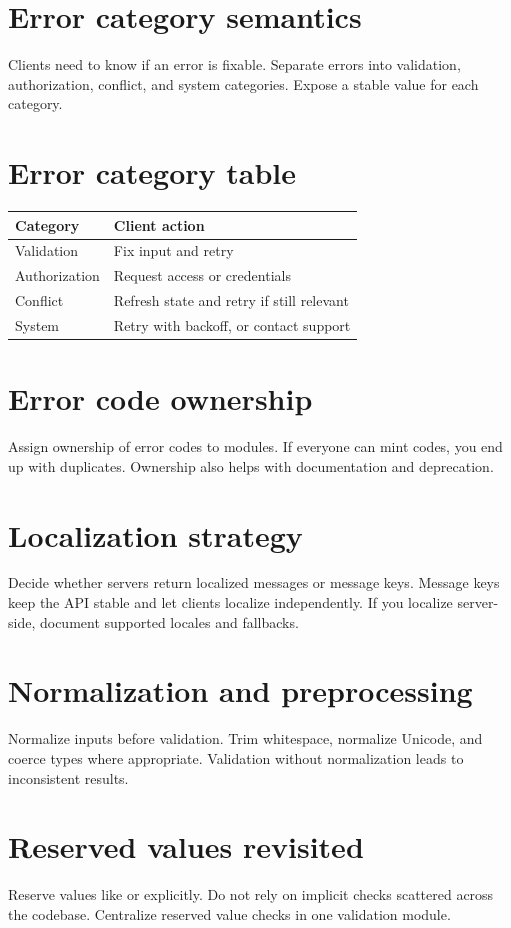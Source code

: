 \section{Error category semantics}
Clients need to know if an error is fixable.
Separate errors into validation, authorization, conflict, and system categories.
Expose a stable  value for each category.

\section{Error category table}
\begin{tabularx}{\textwidth}{@{}lX@{}}
\toprule
Category & Client action \\
\midrule
Validation & Fix input and retry \\
Authorization & Request access or credentials \\
Conflict & Refresh state and retry if still relevant \\
System & Retry with backoff, or contact support \\
\bottomrule
\end{tabularx}

\section{Error code ownership}
Assign ownership of error codes to modules.
If everyone can mint codes, you end up with duplicates.
Ownership also helps with documentation and deprecation.

\section{Localization strategy}
Decide whether servers return localized messages or message keys.
Message keys keep the API stable and let clients localize independently.
If you localize server-side, document supported locales and fallbacks.

\section{Normalization and preprocessing}
Normalize inputs before validation.
Trim whitespace, normalize Unicode, and coerce types where appropriate.
Validation without normalization leads to inconsistent results.

\section{Reserved values revisited}
Reserve values like  or  explicitly.
Do not rely on implicit checks scattered across the codebase.
Centralize reserved value checks in one validation module.

